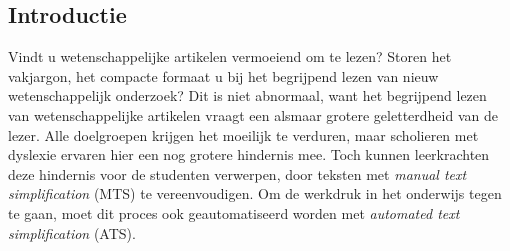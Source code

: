 \documentclass[a0,portrait]{hogent-poster}
\begin{document}
\begin{multicols}{2} %

\section{Introductie}

Vindt u wetenschappelijke artikelen vermoeiend om te lezen? Storen het vakjargon, het compacte formaat u bij het begrijpend lezen van nieuw wetenschappelijk onderzoek? Dit is niet abnormaal, want het begrijpend lezen van wetenschappelijke artikelen vraagt een alsmaar grotere geletterdheid van de lezer. Alle doelgroepen krijgen het moeilijk te verduren, maar scholieren met dyslexie ervaren hier een nog grotere hindernis mee. Toch kunnen leerkrachten deze hindernis voor de studenten verwerpen, door teksten met \textit{manual text simplification} (MTS) te vereenvoudigen. Om de werkdruk in het onderwijs tegen te gaan, moet dit proces ook geautomatiseerd worden met \textit{automated text simplification} (ATS).






\end{multicols}
\end{document}
